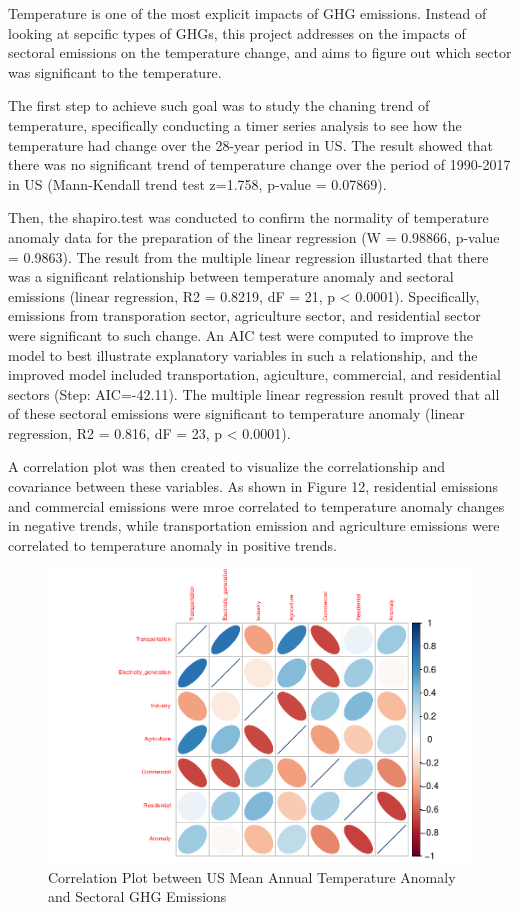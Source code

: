 \documentclass[12pt,]{article}
\begin{document}
Temperature is one of the most explicit impacts of GHG emissions.
Instead of looking at sepcific types of GHGs, this project addresses on
the impacts of sectoral emissions on the temperature change, and aims to
figure out which sector was significant to the temperature.

The first step to achieve such goal was to study the chaning trend of
temperature, specifically conducting a timer series analysis to see how
the temperature had change over the 28-year period in US. The result
showed that there was no significant trend of temperature change over
the period of 1990-2017 in US (Mann-Kendall trend test z=1.758, p-value
= 0.07869).

Then, the shapiro.test was conducted to confirm the normality of
temperature anomaly data for the preparation of the linear regression (W
= 0.98866, p-value = 0.9863). The result from the multiple linear
regression illustarted that there was a significant relationship between
temperature anomaly and sectoral emissions (linear regression, R2 =
0.8219, dF = 21, p \textless{} 0.0001). Specifically, emissions from
transporation sector, agriculture sector, and residential sector were
significant to such change. An AIC test were computed to improve the
model to best illustrate explanatory variables in such a relationship,
and the improved model included transportation, agiculture, commercial,
and residential sectors (Step: AIC=-42.11). The multiple linear
regression result proved that all of these sectoral emissions were
significant to temperature anomaly (linear regression, R2 = 0.816, dF =
23, p \textless{} 0.0001).

A correlation plot was then created to visualize the correlationship and
covariance between these variables. As shown in Figure 12, residential
emissions and commercial emissions were mroe correlated to temperature
anomaly changes in negative trends, while transportation emission and
agriculture emissions were correlated to temperature anomaly in positive
trends.

\begin{figure}
\centering
\includegraphics{Project_Code_files/figure-latex/unnamed-chunk-31-1.pdf}
\caption{Correlation Plot between US Mean Annual Temperature Anomaly and
Sectoral GHG Emissions}
\end{figure}
\end{document}
